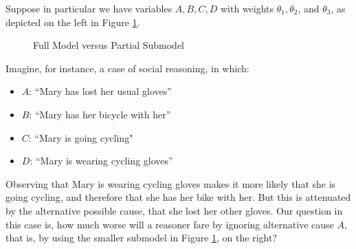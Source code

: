 \documentclass[10pt,letterpaper]{article}
\begin{document}
Suppose in particular we have variables $A,B,C,D$ with weights $\theta_1, \theta_2$, and $\theta_3$, as depicted on the left in Figure \ref{noisy-or}.
\begin{figure}[h] 
\begin{center}
   \hspace{0.7in}
\end{center} \caption{Full Model versus Partial Submodel} \label{noisy-or}
\end{figure} 

\noindent Imagine, for instance, a case of social reasoning, in which: \begin{itemize} \item[] $A$: ``Mary has lost her usual gloves'' \item[] $B$: ``Mary has her bicycle with her''  \item[] $C$: ``Mary is going cycling"  \item[] $D$:  ``Mary is wearing cycling gloves'' \end{itemize}
Observing that Mary is wearing cycling gloves makes it more likely that she is going cycling, and therefore that she has her bike with her. But this is attenuated by the alternative possible cause, that she lost her other gloves. Our question in this case is, how much worse will a reasoner fare by ignoring alternative cause $A$, that is, by using the smaller submodel  in Figure \ref{noisy-or}, on the right?
\end{document}
